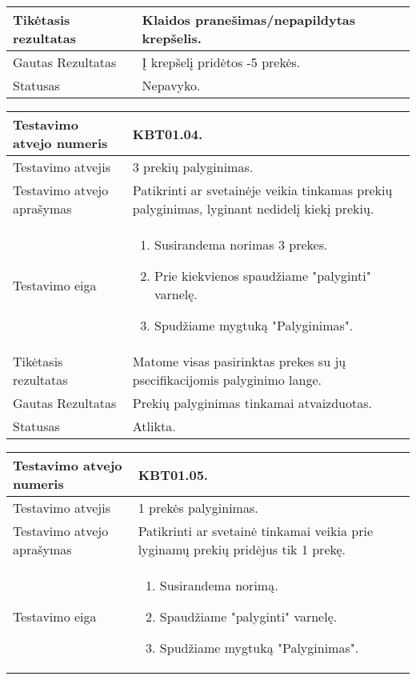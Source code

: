 \documentclass{VUMIFPSkursinis}
\begin{document}
\begin{center}
\begin{tabular}{ |p{5cm}|p{10cm}|}
	Tikėtasis rezultatas & Klaidos pranešimas/nepapildytas krepšelis. \\ \hline
	Gautas Rezultatas & Į krepšelį pridėtos -5 prekės. \\ \hline
	Statusas & Nepavyko. \\ \hline
	\end{tabular}
\vspace{1cm}
\begin{tabular}{ |p{5cm}|p{10cm}|}
	\hline
	Testavimo atvejo numeris & KBT01.04. \\ \hline
	Testavimo atvejis & 3 prekių palyginimas. \\ \hline
	Testavimo atvejo aprašymas & Patikrinti ar svetainėje veikia tinkamas prekių palyginimas, lyginant nedidelį kiekį prekių. \\ \hline
	Testavimo eiga & 
	\begin{enumerate} 
		\item Susirandema norimas 3 prekes.
		\item Prie kiekvienos spaudžiame "palyginti" varnelę.
		\item Spudžiame mygtuką "Palyginimas".
	\end{enumerate} \\ \hline
	Tikėtasis rezultatas & Matome visas pasirinktas prekes su jų psecifikacijomis palyginimo lange. \\ \hline
	Gautas Rezultatas & Prekių palyginimas tinkamai atvaizduotas. \\ \hline
	Statusas & Atlikta. \\ \hline
	\end{tabular}
\vspace{1cm}
\begin{tabular}{ |p{5cm}|p{10cm}|}
	\hline
	Testavimo atvejo numeris & KBT01.05. \\ \hline
	Testavimo atvejis & 1 prekės palyginimas. \\ \hline
	Testavimo atvejo aprašymas & Patikrinti ar svetainė tinkamai veikia prie lyginamų prekių pridėjus tik 1 prekę. \\ \hline
	Testavimo eiga &  
	\begin{enumerate} 
		\item Susirandema norimą.
		\item Spaudžiame "palyginti" varnelę.
		\item Spudžiame mygtuką "Palyginimas".
	\end{enumerate} \\ \hline

\end{tabular}
\end{center}
\end{document}
